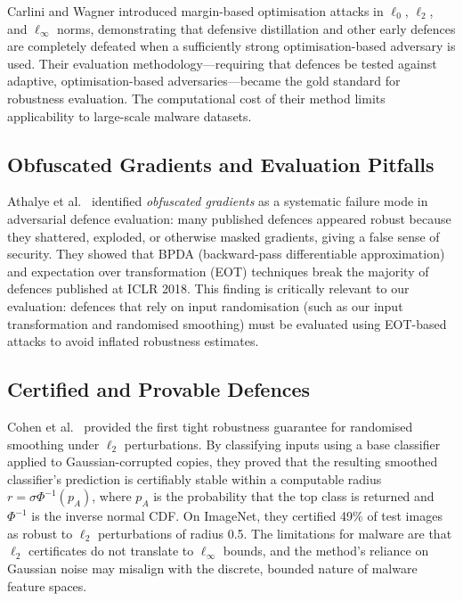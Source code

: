 \documentclass[conference]{IEEEtran}
\begin{document}
Carlini and Wagner \cite{carlini2017} introduced margin-based optimisation attacks in $\ell_0$, $\ell_2$, and $\ell_\infty$ norms, demonstrating that defensive distillation and other early defences are completely defeated when a sufficiently strong optimisation-based adversary is used. Their evaluation methodology---requiring that defences be tested against adaptive, optimisation-based adversaries---became the gold standard for robustness evaluation. The computational cost of their method limits applicability to large-scale malware datasets.

\subsection{Obfuscated Gradients and Evaluation Pitfalls}

Athalye et al.\ \cite{athalye2018} identified \emph{obfuscated gradients} as a systematic failure mode in adversarial defence evaluation: many published defences appeared robust because they shattered, exploded, or otherwise masked gradients, giving a false sense of security. They showed that BPDA (backward-pass differentiable approximation) and expectation over transformation (EOT) techniques break the majority of defences published at ICLR 2018. This finding is critically relevant to our evaluation: defences that rely on input randomisation (such as our input transformation and randomised smoothing) must be evaluated using EOT-based attacks to avoid inflated robustness estimates.

\subsection{Certified and Provable Defences}

Cohen et al.\ \cite{cohen2019} provided the first tight robustness guarantee for randomised smoothing under $\ell_2$ perturbations. By classifying inputs using a base classifier applied to Gaussian-corrupted copies, they proved that the resulting smoothed classifier's prediction is certifiably stable within a computable radius $r = \sigma \Phi^{-1}(p_A)$, where $p_A$ is the probability that the top class is returned and $\Phi^{-1}$ is the inverse normal CDF. On ImageNet, they certified 49\% of test images as robust to $\ell_2$ perturbations of radius 0.5. The limitations for malware are that $\ell_2$ certificates do not translate to $\ell_\infty$ bounds, and the method's reliance on Gaussian noise may misalign with the discrete, bounded nature of malware feature spaces.
\end{document}
